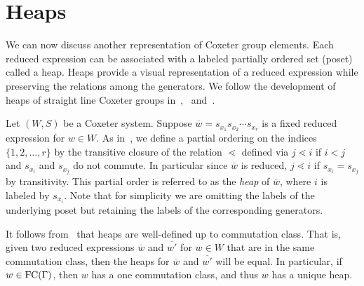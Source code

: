 

\section{Heaps}\label{sec:Heaps}

We can now discuss another representation of Coxeter group elements. Each reduced expression can be associated with a labeled partially ordered set (poset) called a heap.  Heaps provide a visual representation of a reduced expression while preserving the relations among the generators. We follow the development of heaps of straight line Coxeter groups in~\cite{Billey2007},~\cite{Ernst2010} and~\cite{Stembridge1996}. 

Let $(W,S)$ be a Coxeter system. Suppose $\overline{w}=s_{x_1}s_{x_2}\cdots s_{x_r}$ is a fixed reduced expression for $w \in W$. As in~\cite{Stembridge1996}, we define a partial ordering on the indices $\{1, 2, \ldots, r\}$ by the transitive closure of the relation $\lessdot$ defined via $j \lessdot i$ if $i < j$ and $s_{x_i}$ and $s_{x_j}$ do not commute. In particular since $\overline{w}$ is reduced, $j \lessdot i$ if $s_{x_i}=s_{x_j}$ by transitivity. This partial order is referred to as the \emph{heap} of $\overline{w}$, where $i$ is labeled by $s_{x_i}$. Note that for simplicity we are omitting the labels of the underlying poset but retaining the labels of the corresponding generators.

It follows from~\cite{Stembridge1996} that heaps are well-defined up to commutation class. That is, given two reduced expressions $\overline{w}$ and $\overline{w'}$ for $w \in W$ that are in the same commutation class, then the heaps for $\overline{w}$ and $\overline{w'}$ will be equal. In particular, if $w \in \mathrm{FC}(\Gamma)$, then $w$ has a one commutation class, and thus $w$ has a unique heap.

